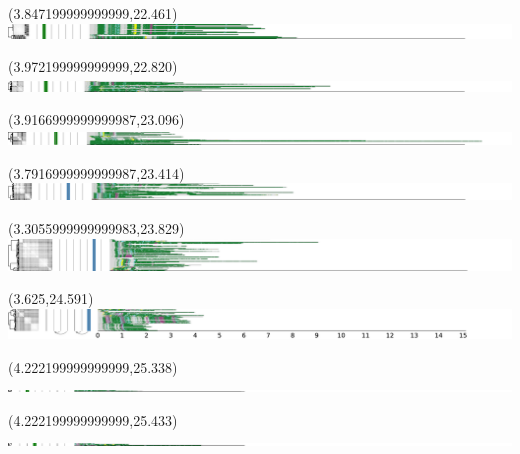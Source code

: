 \documentclass{article}
\begin{document}
\begin{textblock}{13}(3.847199999999999,22.461)\includegraphics{haplotypes-constrained/chr15-HG002.pdf}\end{textblock}
\begin{textblock}{13}(3.972199999999999,22.820)\includegraphics{haplotypes-constrained/chr15-HG003.pdf}\end{textblock}
\begin{textblock}{13}(3.9166999999999987,23.096)\includegraphics{haplotypes-constrained/chr15-HG004.pdf}\end{textblock}
\begin{textblock}{13}(3.7916999999999987,23.414)\includegraphics{haplotypes-constrained/chr15-HG005.pdf}\end{textblock}
\begin{textblock}{13}(3.3055999999999983,23.829)\includegraphics{haplotypes-constrained/chr15-HG006.pdf}\end{textblock}
\begin{textblock}{13}(3.625,24.591)\includegraphics{haplotypes-constrained/chr15-HG007.pdf}\end{textblock}
\begin{textblock}{13}(4.222199999999999,25.338)\includegraphics{haplotypes-constrained/16qtel_1-500K_1_12_12_rc-HG002.pdf}\end{textblock}
\begin{textblock}{13}(4.222199999999999,25.433)\includegraphics{haplotypes-constrained/16qtel_1-500K_1_12_12_rc-HG003.pdf}\end{textblock}
\end{document}
